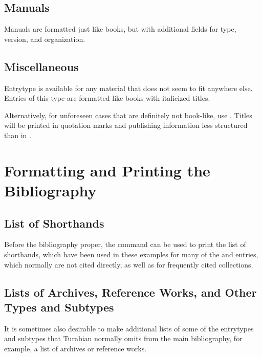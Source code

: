 \documentclass{ltxdockit}[2010/02/12]
\begin{document}
{\subsection{Manuals}
Manuals are formatted just like books, but with additional fields for type, version, and organization.\autocites[][]{turabian:2007a,2373}

\subsection{Miscellaneous}
Entrytype  is available for any material that does not seem to fit anywhere else. Entries of this type are formatted like books with italicized titles.\autocites{u.-s.-gauges-and-thermometers:misc}

Alternatively, for unforeseen cases that are definitely not book-like, use . Titles will be printed in quotation marks and publishing information less structured than in .




\newpage

\section{Formatting and Printing the Bibliography}



\subsection{List of Shorthands}
Before the bibliography proper,  the command  can be used to print  the list of shorthands, which have been used in these examples for many of the  and  entries, which normally are not cited directly, as well as for frequently cited collections.

\printshorthands

\subsection{Lists of Archives, Reference Works, and Other Types and Subtypes}
It is sometimes also desirable to make additional lists of some of the entrytypes and subtypes that Turabian normally omits from the main bibliography, for example, a list of archives or reference works. 

}
\end{document}
